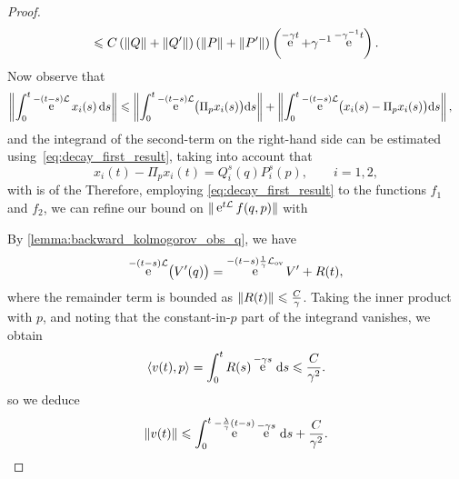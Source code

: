 \documentclass[11pt,a4paper]{article}
\DeclareMathOperator{\e}{e}
\renewcommand{\d}{\mathrm d}
\theoremstyle{plain}
\numberwithin{equation}{section}
\renewcommand{\leq}{\leqslant}
\begin{document}
\begin{proof}
\begin{equation}
        \leq C \left( \norm*{Q} +  \norm*{Q'}\right) \left( \norm*{P} + \norm*{P'} \right)
        \left(\e^{-\gamma t} + \gamma^{-1} \e^{-\gamma^{-1} t}\right).
    \end{equation}
    Now observe that
    \begin{align*}
        \norm{ \int_{0}^{t} \e^{- (t-s) \mathcal L}  x_i(s) \, \d s }
        &\leq \norm{ \int_{0}^{t} \e^{- (t-s) \mathcal L}  \bigl( \Pi_p x_i(s) \bigr) \d s }
        + \norm{ \int_{0}^{t} \e^{- (t-s) \mathcal L}  \bigl(x_i(s) - \Pi_p x_i(s)\bigr)  \d s},
    \end{align*}
    and the integrand of the second-term on the right-hand side can be estimated using~\eqref{eq:decay_first_result},
    taking into account that
    \[
        x_i(t) - \Pi_p x_i(t) = Q^s_i(q) P^s_i(p), \qquad i = 1, 2,
    \]
    with
    is of the
    Therefore, employing \eqref{eq:decay_first_result} to the functions $f_1$ and $f_2$,
    we can refine our bound on $\norm*{ \e^{t \mathcal L} f(q,p) }$
    with

    By \cref{lemma:backward_kolmogorov_obs_q},
    we have
    \[
        \e^{- (t-s) \mathcal L} \bigl(V'(q)\bigr)
        = \e^{- (t-s) \frac{1}{\gamma}\mathcal L_{\rm ov}} V' + R(t),
    \]
    where the remainder term is bounded as $\norm{R(t)} \leq \frac{C}{\gamma}$.
    Taking the inner product with $p$,
    and noting that the constant-in-$p$ part of the integrand vanishes,
    we obtain
    \[
        \ip{v(t)}{p} = \int_{0}^{t} R(s) \e^{-\gamma s} \, \d s
        \leq \frac{C}{\gamma^2}.
    \]
    so we deduce
    \[
        \norm{v(t)} \leq \int_{0}^{t} \e^{- \frac{\lambda}{\gamma}(t-s)} \e^{- \gamma s} \, \d s + \frac{C}{\gamma^2}.
    \]
\end{proof}
\end{document}
